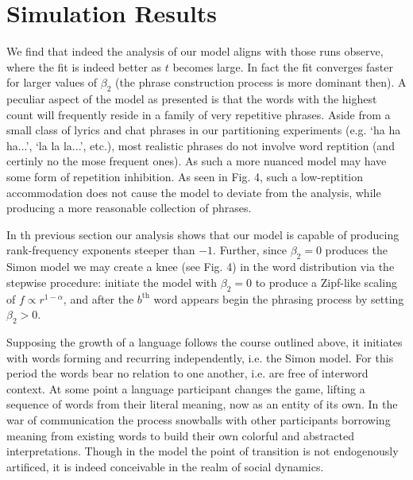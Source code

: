 \section{Simulation Results}
\label{sec:textpart.simresults}

We find that indeed the analysis of our model aligns with those runs
observe, where the fit is indeed better as $t$ becomes large. In fact
the fit converges faster for larger values of $\beta_2$ (the phrase
construction process is more dominant then). A peculiar aspect of the
model as presented is that the words with the highest count will
frequently reside in a family of very repetitive phrases. Aside from a
small class of lyrics and chat phrases in our partitioning experiments
(e.g. `ha ha ha...', `la la la...', etc.), most realistic phrases
do not involve word reptition (and certinly no the mose frequent
ones). As such a more nuanced model may have some form of repetition
inhibition. As seen in Fig. 4, such a low-reptition accommodation does
not cause the model to deviate from the analysis, while producing a
more reasonable collection of phrases.

In th previous section our analysis shows that our model is capable of
producing rank-frequency exponents steeper than $-1$. Further, since
$\beta_2=0$ produces the Simon model we may create a knee (see Fig. 4)
in the word distribution via the stepwise procedure: initiate the
model with $\beta_2=0$ to produce a Zipf-like scaling of $f\propto
r^{1-\alpha}$, and after the $b^\text{th}$ word appears begin
the phrasing process by setting $\beta_2>0$.

Supposing the growth of a language follows the course outlined above, it 
initiates with words forming and recurring independently, i.e. the
Simon model. For this period the words bear no relation to one another, 
i.e. are free of interword context. At some point a language participant 
changes the game, lifting a sequence of words from their literal meaning, 
now as an entity of its own. In the war of communication the process
snowballs with other participants borrowing meaning from existing words
to build their own colorful and abstracted interpretations. Though in
the model the point of transition is not endogenously artificed, it is
indeed conceivable in the realm of social dynamics.



